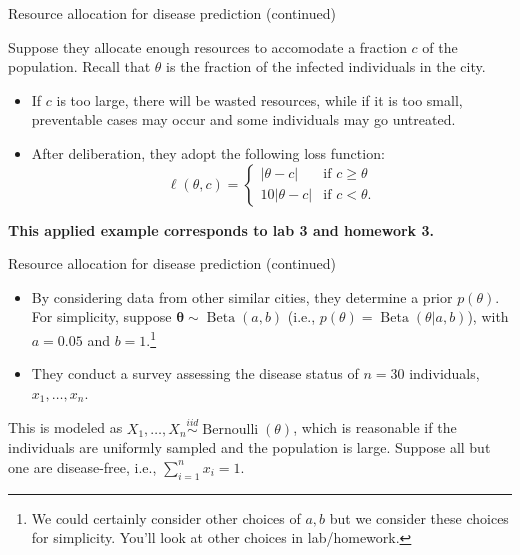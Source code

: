 \documentclass[
  ignorenonframetext,
]{beamer}
\providecommand{\tightlist}{%
  \setlength{\itemsep}{0pt}\setlength{\parskip}{0pt}}
\newcommand{\btheta}{{\bm\theta}}
\DeclareMathOperator*{\Bernoulli}{Bernoulli}
\DeclareMathOperator*{\Beta}{Beta}
\newcommand{\branch}[4]{
\left\{
	\begin{array}{ll}
		#1  & \mbox{if } #2 \\
		#3 & \mbox{if } #4
	\end{array}
\right.
}
\begin{document}
\begin{frame}{Resource allocation for disease prediction (continued)}
\protect\hypertarget{resource-allocation-for-disease-prediction-continued}{}

Suppose they allocate enough resources to accomodate a fraction \(c\) of
the population. Recall that \(\theta\) is the fraction of the infected
individuals in the city.

\begin{itemize}
\tightlist
\item
  If \(c\) is too large, there will be wasted resources, while if it is
  too small, preventable cases may occur and some individuals may go
  untreated.
\item
  After deliberation, they adopt the following loss function:
  \[\ell(\theta,c) =\branch{|\theta-c|}{c\geq\theta}
                       {10|\theta-c|}{c<\theta.}\]
\end{itemize}

\vspace*{1em}

\textbf{This applied example corresponds to lab 3 and homework 3.}

\end{frame}

\begin{frame}{Resource allocation for disease prediction (continued)}
\protect\hypertarget{resource-allocation-for-disease-prediction-continued-1}{}

\begin{itemize}
\item
  By considering data from other similar cities, they determine a prior
  \(p(\theta)\). For simplicity, suppose \(\btheta\sim\Beta(a,b)\)
  (i.e., \(p(\theta) =\Beta(\theta|a,b)\)), with \(a=0.05\) and
  \(b=1\).\footnote{We could certainly consider other choices of $a,b$ but we consider these choices for simplicity. You'll look at other choices in lab/homework.}
\item
  They conduct a survey assessing the disease status of \(n=30\)
  individuals, \(x_1,\ldots,x_n\).
\end{itemize}

This is modeled as
\(X_1,\ldots,X_n \stackrel{iid}{\sim} \Bernoulli(\theta)\), which is
reasonable if the individuals are uniformly sampled and the population
is large. Suppose all but one are disease-free, i.e.,
\(\sum_{i=1}^n x_i = 1\).

\end{frame}
\end{document}
